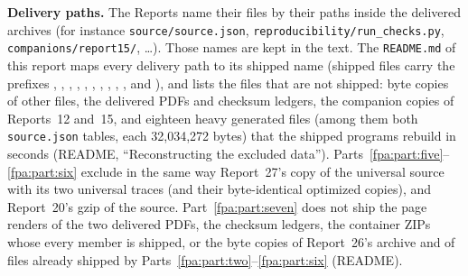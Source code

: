 \documentclass[11pt,a4paper]{article}
\numberwithin{equation}{section}
\newcommand{\code}[1]{\texttt{\small #1}}
\begin{document}
\textbf{Delivery paths.} The Reports name their files by their paths inside the delivered archives (for instance \code{source/source.json}, \code{reproducibility/run\_checks.py}, \code{companions/report15/}, \dots). Those names are kept in the text. The \texttt{README.md} of this report maps every delivery path to its shipped name (shipped files carry the prefixes , , , , , , , , , ,  and ), and lists the files that are not shipped: byte copies of other files, the delivered PDFs and checksum ledgers, the companion copies of Reports~12 and~15, and eighteen heavy generated files (among them both \code{source.json} tables, each 32,034,272 bytes) that the shipped programs rebuild in seconds (README, ``Reconstructing the excluded data''). Parts~\ref{fpa:part:five}--\ref{fpa:part:six} exclude in the same way Report~27's copy of the universal source with its two universal traces (and their byte-identical optimized copies), and Report~20's gzip of the source. Part~\ref{fpa:part:seven} does not ship the page renders of the two delivered PDFs, the checksum ledgers, the container ZIPs whose every member is shipped, or the byte copies of Report~26's archive and of files already shipped by Parts~\ref{fpa:part:two}--\ref{fpa:part:six} (README).
\end{document}
